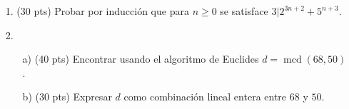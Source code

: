 \documentclass[a4paper,12pt,twoside,spanish]{amsbook}
\begin{document}

\begin{ejercicio}
	\begin{enumerate}
		\item[1.] (30 pts) Probar por inducción que para $n \ge 0$ se satisface $3 | 2^{3n+2} + 5^{n+3}$.  
		\item[2.] 
		\begin{enumerate}
			\item[a)] (40 pts) Encontrar usando el algoritmo de Euclides $d = \operatorname{mcd}( 68, 50)$. 
			\item[b)] (30 pts) Expresar $d$  como combinación lineal entera entre  $68$ y $50$.
		\end{enumerate}	 
	\end{enumerate}
\end{ejercicio}
	
\begin{comment}
\begin{solucion}
	1. Como  $n | m$,  entonces existe $q$, número entero, tal que $m = n \cdot q$.
	
	Ahora bien, 
	$$
	m^3 = (n \cdot q)^3 = n^3 \cdot q^3 = n ( n^2 q^3).
	$$
	Por  lo tanto, $n|m^3$.
	
\vskip .4cm

	2 (a).  Primero hallamos el mcd entre  162 y 138.
	\begin{align}	
		162 &= 138  \cdot 1 + 24\\		
		138 &= 24  \cdot 5+ 18\\		
		24 &= 18  \cdot 1+ 6\\		
		18 &= 6  \cdot 3 + 0 
	\end{align}
	Como el último resto no nulo es  6, tenemos que \colorbox{lightgray}{$\operatorname{mcd}(162, 138) =6$}.
	
		\vskip .4cm
	2 (b). Ahora escribamos 6 como combinación lineal entera de   162 y 138.
		\begin{alignat*}2
		6 &= 24 -18& \qquad\qquad&(\text{por (3)}) \\
		&=  24 -(138 -24  \cdot 5 ) & \qquad\qquad&(\text{por (2)}) \\
		&=  24 +(-1) \cdot 138 +5 \cdot 24& & \\
		&= (-1) \cdot 138 +6 \cdot 24& & \\
		&= (-1) \cdot 138 +6 \cdot (162-138)& \qquad\qquad&(\text{por (1)}) \\
		&= (-1) \cdot 138 +6 \cdot 162 + (-6)\cdot 138& & \\
		&= (-7) \cdot 138 +6 \cdot 162& \qquad\qquad&
	\end{alignat*}
	
	Es decir \colorbox{lightgray}{$6 = 6 \cdot 162+ (-7) \cdot 138$}.
\end{solucion}

\end{comment}
\end{document}
